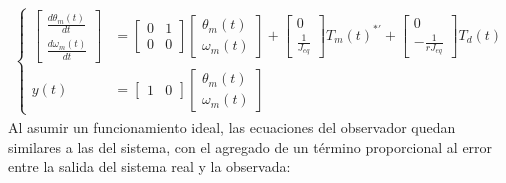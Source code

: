 \documentclass[a4paper, 10pt, onecolumn,journal]{ieeeconf}
\begin{document}
\begin{align}
	\begin{cases}
		\begin{bmatrix}
			\frac{d\theta_m(t)}{dt} \\ 
			\frac{d\omega_m(t)}{dt}
		\end{bmatrix} &= 
		\begin{bmatrix}
			0 & 1 \\ 
			0 & 0
		\end{bmatrix}
		\begin{bmatrix}
			{\theta}_m(t) \\ 
			{\omega}_m(t)
		\end{bmatrix} + 
		\begin{bmatrix}
			0 \\ 
			\frac{1}{J_{eq}}
		\end{bmatrix} {T_m(t)}^{*'} +
		\begin{bmatrix}
			0 \\ 
			-\frac{1}{r J_{eq}}
		\end{bmatrix} T_d(t)\\
		y(t) &= \begin{bmatrix}
			1 & 0
		\end{bmatrix} \begin{bmatrix}
		{\theta}_m(t) \\ 
		{\omega}_m(t)
		\end{bmatrix}
	\end{cases}\label{ecuacion matricial de subsistema mecanico compensado}
\end{align}
Al asumir un funcionamiento ideal, las ecuaciones del observador quedan similares a las del sistema, con el agregado de un término proporcional al error entre la salida del sistema real y la observada:
\end{document}
